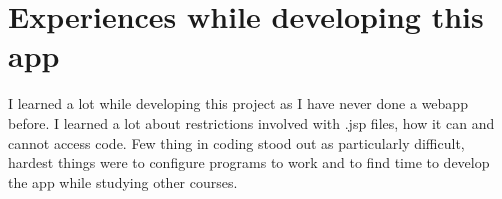 \documentclass[a4paper,12pt]{article}
\begin{document}
\section{Experiences while developing this app}
I learned a lot while developing this project as I have never done a webapp before. I learned a lot about restrictions involved with .jsp files, how it can and cannot access code. Few thing in coding stood out as particularly difficult, hardest things were to configure programs to work and to find time to develop the app while studying other courses.
\end{document}
